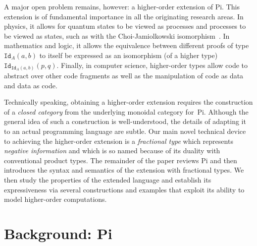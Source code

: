 \documentclass[preprint]{sigplanconf}
\begin{document}
A major open problem remains, however: a higher-order extension of
{{Pi}}. This extension is of fundamental importance in all the originating
research areas.
In physics, it allows for quantum states to be viewed as processes and
processes to be viewed as states, such as with the Choi-Jamiolkowski
isomorphism~\cite{choi1975completely,jamiolkowski1972linear}.  In mathematics
and logic, it allows the equivalence between different proofs of type
$\texttt{Id}_A(a,b)$ to itself be expressed as an isomorphism (of a higher
type) $\texttt{Id}_{\texttt{Id}_A(a,b)}(p,q)$. Finally, in computer science,
higher-order types allow code to abstract over other code fragments as well
as the manipulation of code as data and data as code.

Technically speaking, obtaining a higher-order extension requires the
construction of a \emph{closed category} from the underlying monoidal
category for~{{Pi}}. Although the general idea of such a construction is
well-understood, the details of adapting it to an actual programming language
are subtle.  Our main novel technical device to achieving the higher-order
extension is a \emph{fractional type} which represents \emph{negative
  information} and which is so named because of its duality with conventional
product types.  
The remainder of the paper reviews {{Pi}} and then introduces the syntax and
semantics of the extension with fractional types. We then study the
properties of the extended language and establish its expressiveness via
several constructions and examples that exploit its ability to model
higher-order computations.


\section{Background: {{Pi}} }
\label{sec:pi}
\end{document}
